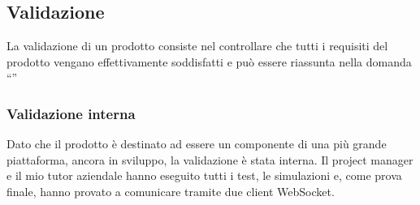 	\subsection{Validazione}
	La validazione di un prodotto consiste nel controllare che tutti i requisiti del prodotto vengano effettivamente soddisfatti e può essere riassunta nella domanda ``''
		\subsubsection{Validazione interna}
		Dato che il prodotto è destinato ad essere un componente di una più grande piattaforma, ancora in sviluppo, la validazione è stata interna. Il project manager e il mio tutor aziendale hanno eseguito tutti i test, le simulazioni e, come prova finale, hanno provato a comunicare tramite due client WebSocket.
